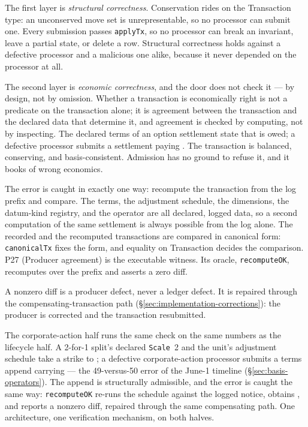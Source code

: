 The first layer is \emph{structural correctness}. Conservation rides on the Transaction type: an unconserved move set is unrepresentable, so no processor can submit one. Every submission passes \texttt{applyTx}, so no processor can break an invariant, leave a partial state, or delete a row. Structural correctness holds against a defective processor and a malicious one alike, because it never depended on the processor at all.

The second layer is \emph{economic correctness}, and the door does not check it --- by design, not by omission. Whether a transaction is economically right is not a predicate on the transaction alone; it is agreement between the transaction and the declared data that determine it, and agreement is checked by computing, not by inspecting. The declared terms of an option settlement state that  is owed; a defective processor submits a settlement paying . The transaction is balanced, conserving, and basis-consistent. Admission has no ground to refuse it, and it books  of wrong economics.

The error is caught in exactly one way: recompute the transaction from the log prefix and compare. The terms, the adjustment schedule, the dimensions, the datum-kind registry, and the operator are all declared, logged data, so a second computation of the same settlement is always possible from the log alone. The recorded and the recomputed transactions are compared in canonical form: \texttt{canonicalTx} fixes the form, and equality on Transaction decides the comparison. P27 (Producer agreement) is the executable witness. Its oracle, \texttt{recomputeOK}, recomputes over the prefix and asserts a zero diff.

A nonzero diff is a producer defect, never a ledger defect. It is repaired through the compensating-transaction path (\S\ref{sec:implementation-corrections}): the producer is corrected and the transaction resubmitted.

The corporate-action half runs the same check on the same numbers as the lifecycle half. A 2-for-1 split's declared \texttt{Scale}~2 and the unit's adjustment schedule take a  strike to ; a defective corporate-action processor submits a terms append carrying  --- the 49-versus-50 error of the June-1 timeline (\S\ref{sec:basis-operators}). The append is structurally admissible, and the error is caught the same way: \texttt{recomputeOK} re-runs the schedule against the logged notice, obtains , and reports a nonzero diff, repaired through the same compensating path. One architecture, one verification mechanism, on both halves.

